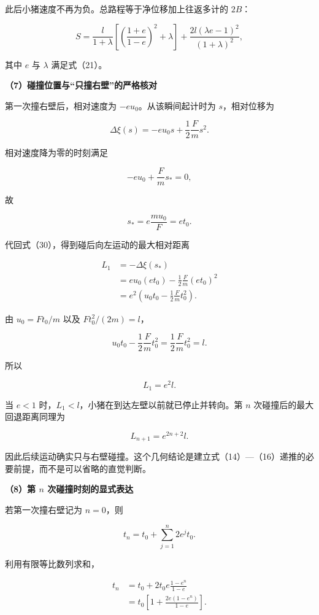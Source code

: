 \documentclass[12pt,a4paper,UTF8]{ctexart}
\begin{document}
此后小猪速度不再为负。总路程等于净位移加上往返多计的 \(2B\)：

\[
\boxed{
S
=\frac{l}{1+\lambda}
\left[
\left(\frac{1+e}{1-e}\right)^2+\lambda
\right]
+\frac{2l(\lambda e-1)^2}{(1+\lambda)^2}
},
\tag{29}
\]

其中 \(e\) 与 \(\lambda\) 满足式（21）。

\textbf{（7）碰撞位置与``只撞右壁''的严格核对}

第一次撞右壁后，相对速度为 \(-eu_0\)。从该瞬间起计时为 \(s\)，相对位移为

\[
\Delta \xi(s)=-eu_0s+\frac12\frac Fm s^2.
\tag{30}
\]

相对速度降为零的时刻满足

\[
-eu_0+\frac Fm s_*=0,
\]

故

\[
s_*=e\frac{mu_0}{F}=et_0.
\tag{31}
\]

代回式（30），得到碰后向左运动的最大相对距离

\[
\begin{aligned}
L_1
&=-\Delta\xi(s_*)\\
&=eu_0(et_0)-\frac12\frac Fm(e t_0)^2\\
&=e^2\left(u_0t_0-\frac12\frac Fm t_0^2\right).
\end{aligned}
\]

由 \(u_0=Ft_0/m\) 以及 \(Ft_0^2/(2m)=l\)，

\[
u_0t_0-\frac12\frac Fm t_0^2
=\frac12\frac Fm t_0^2=l.
\]

所以

\[
\boxed{L_1=e^2l}.
\tag{32}
\]

当 \(e<1\) 时，\(L_1<l\)，小猪在到达左壁以前就已停止并转向。第 \(n\)
次碰撞后的最大回退距离同理为

\[
L_{n+1}=e^{2n+2}l.
\tag{33}
\]

因此后续运动确实只与右壁碰撞。这个几何结论是建立式（14）---（16）递推的必要前提，而不是可以省略的直觉判断。

\textbf{（8）第 \(n\) 次碰撞时刻的显式表达}

若第一次撞右壁记为 \(n=0\)，则

\[
t_n=t_0+\sum_{j=1}^{n}2e^jt_0.
\]

利用有限等比数列求和，

\[
\begin{aligned}
t_n
&=t_0+2t_0e\frac{1-e^n}{1-e}\\
&=t_0\left[1+\frac{2e(1-e^n)}{1-e}\right].
\end{aligned}
\tag{34}
\]
\end{document}
